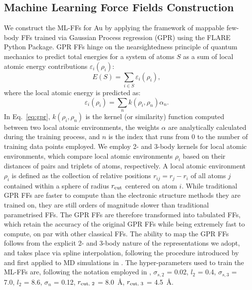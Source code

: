 \documentclass[%
aip,
 amsmath,amssymb,
 reprint,
]{revtex4-1}
\newcommand*\subt[1]{_{\textnormal{#1}}}
\begin{document}
\subsection*{Machine Learning Force Fields Construction}
\label{subsec:mlff}
%
We construct the ML-FFs for Au by applying the framework of mappable few-body FFs trained via Gaussian Process regression (GPR) \cite{Glielmo2018, Zeni2018} using the FLARE Python Package. \cite{vandermause2020fly, xie2021bayesian}
%
GPR FFs hinge on the nearsightedness principle of quantum mechanics to predict total energies for a system of atoms $S$ as a sum of local atomic energy contributions $\varepsilon_i(\rho_i)$:
%
\begin{equation}
E(S) = \sum_{i \in S} \varepsilon_i(\rho_i),
\label{eq:local_energy}
\end{equation}
%
where the local atomic energy is predicted as:
\begin{equation}
\varepsilon_i(\rho_i) = \sum_{n} k(\rho_i, \rho_n) \alpha_n.
\label{eq:gpr}
\end{equation}
%
In Eq.~\ref{eq:gpr}, $k(\rho_i, \rho_n)$ is the kernel (or similarity) function computed between two local atomic environments, the weights $\alpha$ are analytically calculated during the training process, and $n$ is the index that runs from 0 to the number of training data points employed.
%
We employ 2- and 3-body kernels for local atomic environments, which compare local atomic environments $\rho_i$ based on their distances of pairs and triplets of atoms, respectively. \cite{Glielmo2017, Glielmo2018, Zeni2018}
%
A local atomic environment $\rho_i$ is defined as the collection of relative positions $r_{ij} = r_j - r_i$ of all atoms $j$ contained within a sphere of radius $r\subt{cut}$ centered on atom $i$.
%
While traditional GPR FFs are faster to compute than the electronic structure methods they are trained on, they are still orders of magnitude slower than traditional parametrised FFs.
%
The GPR FFs are therefore transformed into tabulated FFs, which retain the accuracy of the original GPR FFs while being extremely fast to compute, on par with other classical FFs.
%
The ability to map the GPR FFs follows from the explicit 2- and 3-body nature of the representations we adopt, and takes place via spline interpolation, following the procedure introduced by \citet{Glielmo2018} and first applied to MD simulations in \citet{Zeni2018}.
%
The hyper-parameters used to train the ML-FFs are, following the notation employed in \citet{vandermause2020fly},  $\sigma_{s, 2}$ = 0.02, $l_{2}$ =  0.4, $\sigma_{s, 3}$ = 7.0, $l_{2}$ =  8.6, $\sigma_n$ = 0.12, $r\subt{cut, 2}$ = 8.0~$\text{\AA}$, $r\subt{cut, 3}$ = 4.5~$\text{\AA}$.
%
\end{document}
